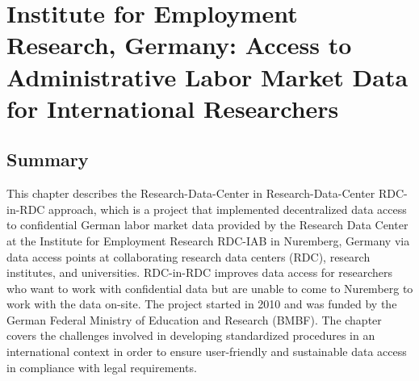 \hypertarget{iab}{%
\chapter{Institute for Employment Research, Germany: Access to Administrative Labor Market Data for International Researchers}\label{iab}}

\hrulefill

\hypertarget{summary-1}{%
\section{Summary}\label{summary-1}}

This chapter describes the Research-Data-Center in Research-Data-Center RDC-in-RDC approach, which is a project that implemented decentralized data access to confidential German labor market data provided by the Research Data Center at the Institute for Employment Research RDC-IAB in Nuremberg, Germany via data access points at collaborating research data centers (RDC), research institutes, and universities. RDC-in-RDC improves data access for researchers who want to work with confidential data but are unable to come to Nuremberg to work with the data on-site. The project started in 2010 and was funded by the German Federal Ministry of Education and Research (BMBF). The chapter covers the challenges involved in developing standardized procedures in an international context in order to ensure user-friendly and sustainable data access in compliance with legal requirements.

